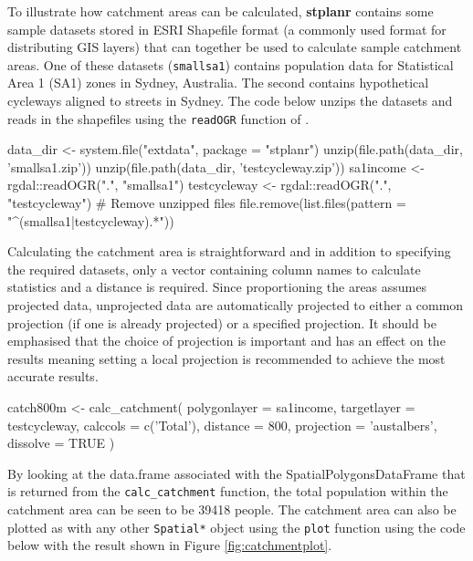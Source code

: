To illustrate how catchment areas can be calculated, \textbf{stplanr}
contains some sample datasets stored in ESRI Shapefile format (a
commonly used format for distributing GIS layers) that can together be
used to calculate sample catchment areas. One of these datasets
(\texttt{smallsa1}) contains population data for Statistical Area 1
(SA1) zones in Sydney, Australia. The second contains hypothetical
cycleways aligned to streets in Sydney. The code below unzips the
datasets and reads in the shapefiles using the \texttt{readOGR} function
of .

\begin{Schunk}
\begin{Sinput}
data_dir <- system.file("extdata", package = "stplanr")
unzip(file.path(data_dir, 'smallsa1.zip'))
unzip(file.path(data_dir, 'testcycleway.zip'))
sa1income <- rgdal::readOGR(".", "smallsa1")
testcycleway <- rgdal::readOGR(".", "testcycleway")
# Remove unzipped files
file.remove(list.files(pattern = "^(smallsa1|testcycleway).*"))
\end{Sinput}
\end{Schunk}

Calculating the catchment area is straightforward and in addition to
specifying the required datasets, only a vector containing column names
to calculate statistics and a distance is required. Since proportioning
the areas assumes projected data, unprojected data are automatically
projected to either a common projection (if one is already projected) or
a specified projection. It should be emphasised that the choice of
projection is important and has an effect on the results meaning setting
a local projection is recommended to achieve the most accurate results.

\begin{Schunk}
\begin{Sinput}
catch800m <- calc_catchment(
  polygonlayer = sa1income,
  targetlayer = testcycleway,
  calccols = c('Total'),
  distance = 800,
  projection = 'austalbers',
  dissolve = TRUE
)
\end{Sinput}
\end{Schunk}

By looking at the data.frame associated with the
SpatialPolygonsDataFrame that is returned from the
\texttt{calc\_catchment} function, the total population within the
catchment area can be seen to be 39418 people. The catchment area can
also be plotted as with any other \texttt{Spatial*} object using the
\texttt{plot} function using the code below with the result shown in
Figure \ref{fig:catchmentplot}.

